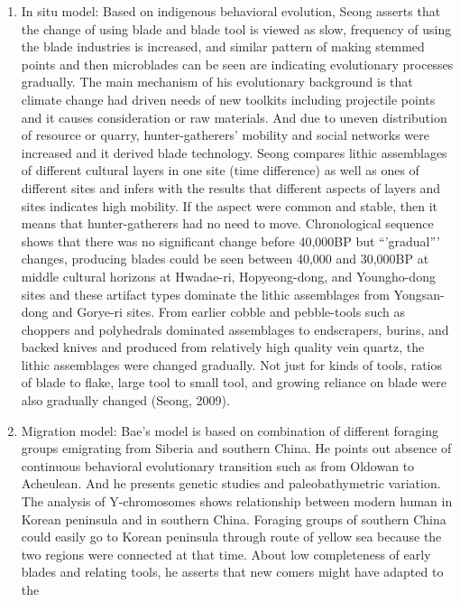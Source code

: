 \documentclass[american,man]{apa6}
\begin{document}
\begin{enumerate}
\def\labelenumi{(\arabic{enumi})}
\item
  In situ model: Based on indigenous behavioral evolution, Seong asserts
  that the change of using blade and blade tool is viewed as slow,
  frequency of using the blade industries is increased, and similar
  pattern of making stemmed points and then microblades can be seen are
  indicating evolutionary processes gradually. The main mechanism of his
  evolutionary background is that climate change had driven needs of new
  toolkits including projectile points and it causes consideration or
  raw materials. And due to uneven distribution of resource or quarry,
  hunter-gatherers' mobility and social networks were increased and it
  derived blade technology. Seong compares lithic assemblages of
  different cultural layers in one site (time difference) as well as
  ones of different sites and infers with the results that different
  aspects of layers and sites indicates high mobility. If the aspect
  were common and stable, then it means that hunter-gatherers had no
  need to move. Chronological sequence shows that there was no
  significant change before 40,000BP but \enquote{'gradual}' changes,
  producing blades could be seen between 40,000 and 30,000BP at middle
  cultural horizons at Hwadae-ri, Hopyeong-dong, and Youngho-dong sites
  and these artifact types dominate the lithic assemblages from
  Yongsan-dong and Gorye-ri sites. From earlier cobble and pebble-tools
  such as choppers and polyhedrals dominated assemblages to endscrapers,
  burins, and backed knives and produced from relatively high quality
  vein quartz, the lithic assemblages were changed gradually. Not just
  for kinds of tools, ratios of blade to flake, large tool to small
  tool, and growing reliance on blade were also gradually changed
  (Seong, 2009).
\item
  Migration model: Bae's model is based on combination of different
  foraging groups emigrating from Siberia and southern China. He points
  out absence of continuous behavioral evolutionary transition such as
  from Oldowan to Acheulean. And he presents genetic studies and
  paleobathymetric variation. The analysis of Y-chromosomes shows
  relationship between modern human in Korean peninsula and in southern
  China. Foraging groups of southern China could easily go to Korean
  peninsula through route of yellow sea because the two regions were
  connected at that time. About low completeness of early blades and
  relating tools, he asserts that new comers might have adapted to the

\end{enumerate}
\end{document}
